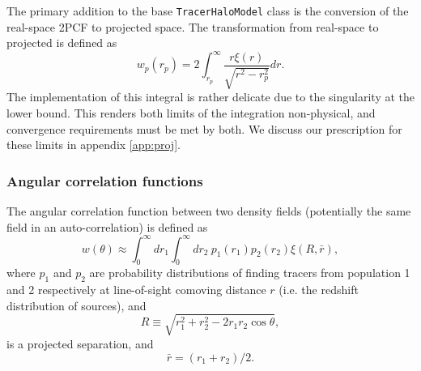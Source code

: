 \documentclass[5p]{elsarticle}
\begin{document}




The primary addition to the base \verb|TracerHaloModel| class is the conversion of the real-space 2PCF to projected space. The transformation from real-space to projected is defined as
\begin{equation}
	\label{eq:wprp}
	w_p(r_p) = 2\int_{r_p}^\infty \frac{r\xi(r)}{\sqrt{r^2-r_p^2}}dr.
\end{equation}
The implementation of this integral is rather delicate due to the singularity at the lower bound. 
This renders both limits of the integration non-physical, and convergence requirements must be met by both. We discuss our prescription for these limits in appendix \ref{app:proj}.

\subsubsection{Angular correlation functions}
\label{sec:halomod:frameworks:angular}
The angular correlation function between two density fields (potentially the same field in an auto-correlation) is defined as \citep{Simon2007}
\begin{equation}
    w(\theta) \approx \int_0^\infty dr_1\int_0^\infty dr_2\ p_1(r_1) p_2(r_2) \xi(R,\bar{r}),
\end{equation} 
where $p_1$ and $p_2$ are probability distributions of finding tracers from population 1 and 2 respectively at line-of-sight comoving distance $r$ (i.e. the redshift distribution of sources), and
\begin{equation}
   R \equiv \sqrt{r_1^2 + r_2^2 - 2r_1r_2 \cos \theta}, 
\end{equation}
is a projected separation, and 
\begin{equation}
   \bar{r} = (r_1+r_2)/2. 
\end{equation}
\end{document}
